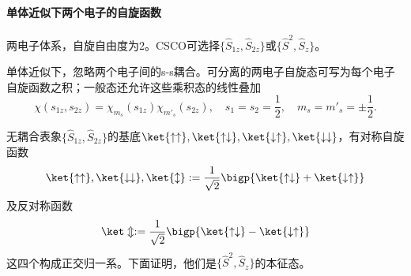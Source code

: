 \paragraph{单体近似下两个电子的自旋函数}
两电子体系，自旋自由度为2。CSCO可选择$\{\hat S_{1z},\hat S_{2z}\}$或$\{\hat S^2,\hat S_z\}$。

单体近似下，忽略两个电子间的s-s耦合。可分离的两电子自旋态可写为每个电子自旋函数之积；一般态还允许这些乘积态的线性叠加
\[
	\chi(s_{1z},s_{2z})=\chi_{m_s}(s_{1z})\chi_{m'_s}(s_{2z}),\quad s_1=s_2=\frac12,\quad m_s=m'_s=\pm\frac12.
\]

无耦合表象$\{\hat S_{1z},\hat S_{2z}\}$的基底$\ket{\uparrow\uparrow},\ket{\uparrow\downarrow},\ket{\downarrow\uparrow},\ket{\downarrow\downarrow}$，有对称自旋函数
\[
	\ket{\uparrow\uparrow},\ket{\downarrow\downarrow},\ket{\updownarrow}:=\frac1{\sqrt2}\bigp{\ket{\uparrow\downarrow}+\ket{\downarrow\uparrow}}
\]
及反对称函数
\[
	\ket\Updownarrow :=\frac1{\sqrt2}\bigp{\ket{\uparrow\downarrow}-\ket{\downarrow\uparrow}}
\]
这四个构成正交归一系。下面证明，他们是$\{\hat S^2,\hat S_z\}$的本征态。


